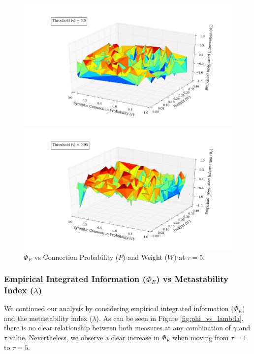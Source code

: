 \documentclass[a4paper,11pt]{article}
\begin{document}
\begin{figure}[H] 
	\begin{minipage}[b]{0.5\linewidth}
		\begin{center}
		\includegraphics[scale = 0.2]{figures/snn/p_w_phi_8_5}
		\end{center}
		\vspace{4ex}
	\end{minipage}
	\begin{minipage}[b]{0.5\linewidth}
		\begin{center}
		\includegraphics[scale = 0.2]{figures/snn/p_w_phi_95_5}
		\end{center}
		\vspace{4ex}
	\end{minipage}
	\caption{
		$\Phi_E$ vs Connection Probability ($P$) and Weight ($W$) at $\tau = 5.$
		\label{fig:p_w_phi_5}
	}
\end{figure}

\subsubsection{Empirical Integrated Information ($\Phi_E$) vs Metastability Index ($\lambda$)}
\label{sec:app:snn:res:phi-lambda}
We continued our analysis by considering empirical integrated information ($\Phi_E$) and the metastability index ($\lambda$). As can be seen in Figure \ref{fig:phi_vs_lambda}, there is no clear relationship between both measures at any combination of $\gamma$ and $\tau$ value. Nevertheless, we observe a clear increase in $\Phi_E$ when moving from $\tau = 1$ to $\tau = 5$.
\end{document}

